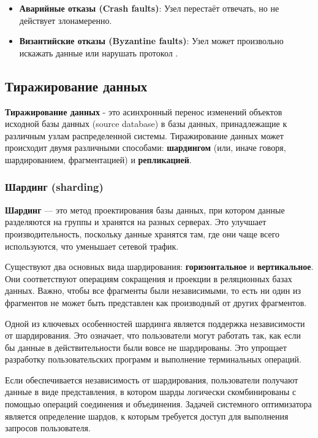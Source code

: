\begin{itemize} 
    \item \textbf{Аварийные отказы (Crash faults)}: Узел перестаёт отвечать, но не действует злонамеренно. 
    \item \textbf{Византийские отказы (Byzantine faults)}: Узел может произвольно искажать данные или нарушать протокол \autocite{Castro1999}. 
\end{itemize}


\subsection{Тиражирование данных}

\textbf{Тиражирование данных} - это асинхронный перенос изменений объектов исходной базы данных (source database)
в базы данных, принадлежащие к различным узлам распределенной системы. Тиражирование данных может происходит
двумя различными способами: \textbf{шардингом} (или, иначе говоря, шардированием, фрагментацией) и \textbf{репликацией}.

\subsubsection{Шардинг (sharding)}

\textbf{Шардинг} — это метод проектирования базы данных, при котором данные разделяются на группы и хранятся на разных серверах. Это улучшает производительность, поскольку данные хранятся там, где они чаще всего используются, что уменьшает сетевой трафик.

Существуют два основных вида шардирования: \textbf{горизонтальное} и \textbf{вертикальное}. Они соответствуют операциям сокращения и проекции в реляционных базах данных. Важно, чтобы все фрагменты были независимыми, то есть ни один из фрагментов не может быть представлен как производный от других фрагментов.

Одной из ключевых особенностей шардинга является поддержка независимости от шардирования. Это означает, что пользователи могут работать так, как если бы данные в действительности были вовсе не шардированы. Это упрощает разработку пользовательских программ и выполнение терминальных операций.

Если обеспечивается независимость от шардирования, пользователи получают данные в виде представления, в котором шарды логически скомбинированы с помощью операций соединения и объединения. Задачей системного оптимизатора является определение шардов, к которым требуется доступ для выполнения запросов пользователя.
\autocite{IntroBD2014}

